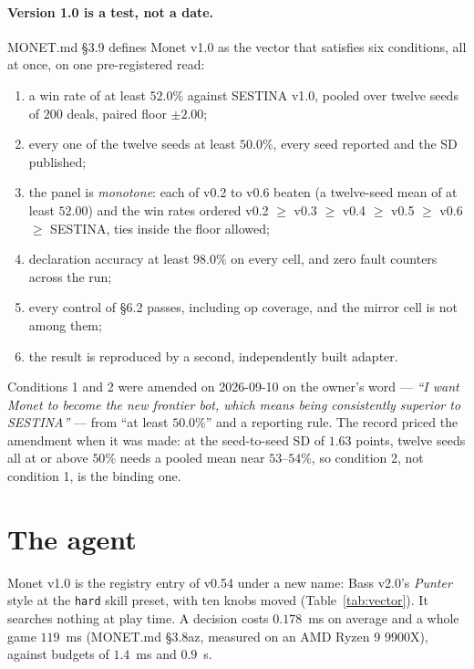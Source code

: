\documentclass[11pt]{article}
\newcommand{\code}[1]{\texttt{#1}}
\newcommand{\monet}{MONET.md}
\newcommand{\sect}[1]{\S#1}
\begin{document}
\paragraph{Version 1.0 is a test, not a date.} \monet{} \sect{3.9} defines Monet v1.0 as the vector
that satisfies six conditions, all at once, on one pre-registered read:
\begin{enumerate}[label=\textbf{C\arabic*}]
  \item a win rate of at least $52.0\%$ against SESTINA v1.0, pooled over twelve seeds of $200$ deals,
        paired floor $\pm 2.00$;
  \item every one of the twelve seeds at least $50.0\%$, every seed reported and the SD published;
  \item the panel is \emph{monotone}: each of v0.2 to v0.6 beaten (a twelve-seed mean of at least
        $52.00$) and the win rates ordered v0.2 $\ge$ v0.3 $\ge$ v0.4 $\ge$ v0.5 $\ge$ v0.6 $\ge$ SESTINA,
        ties inside the floor allowed;
  \item declaration accuracy at least $98.0\%$ on every cell, and zero fault counters across the run;
  \item every control of \sect{6.2} passes, including op coverage, and the mirror cell is not among
        them;
  \item the result is reproduced by a second, independently built adapter.
\end{enumerate}
Conditions 1 and 2 were amended on 2026-09-10 on the owner's word --- \emph{``I want Monet to become the
new frontier bot, which means being consistently superior to SESTINA''} --- from ``at least $50.0\%$''
and a reporting rule. The record priced the amendment when it was made: at the seed-to-seed SD of
$1.63$ points, twelve seeds all at or above $50\%$ needs a pooled mean near $53$--$54\%$, so condition 2,
not condition 1, is the binding one.

\section{The agent}
\label{sec:agent}

Monet v1.0 is the registry entry of v0.54 under a new name: Bass v2.0's \emph{Punter} style at the
\code{hard} skill preset, with ten knobs moved (Table~\ref{tab:vector}). It searches nothing at play
time. A decision costs $0.178$~ms on average and a whole game $119$~ms (\monet{} \sect{3.8az}, measured
on an AMD Ryzen 9 9900X), against budgets of $1.4$~ms and $0.9$~s.
\end{document}
